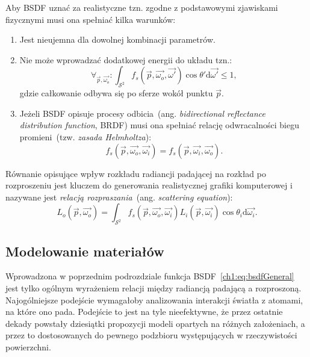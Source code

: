 \begin{itemize}
Aby BSDF uznać za realistyczne tzn. zgodne z podstawowymi zjawiskami fizycznymi musi ona spełniać kilka warunków:
\begin{enumerate}
\item Jest nieujemna dla dowolnej kombinacji parametrów.
\item Nie może wprowadzać dodatkowej energii do układu tzn.:
\begin{equation}
\forall_{\vec{p}, \vec{\omega_o}}: \int_{\mathcal{S}^2}f_s(\vec{p}, \vec{\omega_o}, \vec{\omega'})\cos\theta'\mathrm{d}\vec{\omega'} \leq 1,
\end{equation}
gdzie całkowanie odbywa się po sferze wokół punktu $\vec{p}$.
\item Jeżeli BSDF opisuje procesy odbicia~(ang. \textit{bidirectional reflectance distribution function}, BRDF) musi ona spełniać relację odwracalności biegu promieni~(tzw. \textit{zasada Helmholtza}):
\begin{equation}
f_s(\vec{p}, \vec{\omega_o}, \vec{\omega_i}) = f_s(\vec{p}, \vec{\omega_i}, \vec{\omega_o}).
\end{equation}
\end{enumerate}
Równanie opisujące wpływ rozkładu radiancji padającej na rozkład po rozproszeniu jest kluczem do generowania realistycznej grafiki komputerowej i nazywane jest \textit{relacją rozpraszania}~(ang. \textit{scattering equation}):
\begin{equation}
L_o(\vec{p}, \vec{\omega_o}) = \int_{\mathcal{S}^2}f_s(\vec{p}, \vec{\omega_o}, \vec{\omega_i})L_i(\vec{p}, \vec{\omega_i})\cos\theta_i\mathrm{d}\vec{\omega_i}.
\label{ch1:eq:ScatteringEquation}
\end{equation}
\end{itemize}

\subsection{Modelowanie materiałów}
Wprowadzona w poprzednim podrozdziale funkcja BSDF~\eqref{ch1:eq:bsdfGeneral} jest tylko ogólnym wyrażeniem relacji między radiancją padającą a rozproszoną. Najogólniejsze podejście wymagałoby analizowania interakcji światła z atomami, na które ono pada. Podejście to jest na tyle nieefektywne, że przez ostatnie dekady powstały dziesiątki propozycji modeli opartych na różnych założeniach, a przez to dostosowanych do pewnego podzbioru występujących w rzeczywistości powierzchni. 

